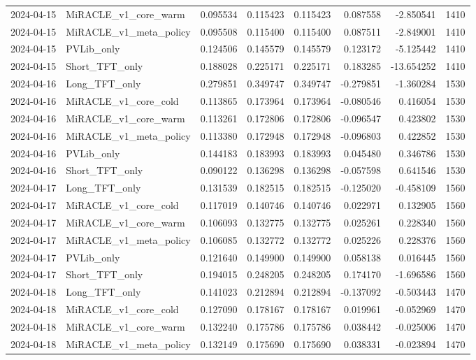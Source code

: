 \begin{tabular}{llrrrrrr}
2024-04-15 & MiRACLE_v1_core_warm & 0.095534 & 0.115423 & 0.115423 & 0.087558 & -2.850541 & 1410 \\
2024-04-15 & MiRACLE_v1_meta_policy & 0.095508 & 0.115400 & 0.115400 & 0.087511 & -2.849001 & 1410 \\
2024-04-15 & PVLib_only & 0.124506 & 0.145579 & 0.145579 & 0.123172 & -5.125442 & 1410 \\
2024-04-15 & Short_TFT_only & 0.188028 & 0.225171 & 0.225171 & 0.183285 & -13.654252 & 1410 \\
2024-04-16 & Long_TFT_only & 0.279851 & 0.349747 & 0.349747 & -0.279851 & -1.360284 & 1530 \\
2024-04-16 & MiRACLE_v1_core_cold & 0.113865 & 0.173964 & 0.173964 & -0.080546 & 0.416054 & 1530 \\
2024-04-16 & MiRACLE_v1_core_warm & 0.113261 & 0.172806 & 0.172806 & -0.096547 & 0.423802 & 1530 \\
2024-04-16 & MiRACLE_v1_meta_policy & 0.113380 & 0.172948 & 0.172948 & -0.096803 & 0.422852 & 1530 \\
2024-04-16 & PVLib_only & 0.144183 & 0.183993 & 0.183993 & 0.045480 & 0.346786 & 1530 \\
2024-04-16 & Short_TFT_only & 0.090122 & 0.136298 & 0.136298 & -0.057598 & 0.641546 & 1530 \\
2024-04-17 & Long_TFT_only & 0.131539 & 0.182515 & 0.182515 & -0.125020 & -0.458109 & 1560 \\
2024-04-17 & MiRACLE_v1_core_cold & 0.117019 & 0.140746 & 0.140746 & 0.022971 & 0.132905 & 1560 \\
2024-04-17 & MiRACLE_v1_core_warm & 0.106093 & 0.132775 & 0.132775 & 0.025261 & 0.228340 & 1560 \\
2024-04-17 & MiRACLE_v1_meta_policy & 0.106085 & 0.132772 & 0.132772 & 0.025226 & 0.228376 & 1560 \\
2024-04-17 & PVLib_only & 0.121640 & 0.149900 & 0.149900 & 0.058138 & 0.016445 & 1560 \\
2024-04-17 & Short_TFT_only & 0.194015 & 0.248205 & 0.248205 & 0.174170 & -1.696586 & 1560 \\
2024-04-18 & Long_TFT_only & 0.141023 & 0.212894 & 0.212894 & -0.137092 & -0.503443 & 1470 \\
2024-04-18 & MiRACLE_v1_core_cold & 0.127090 & 0.178167 & 0.178167 & 0.019961 & -0.052969 & 1470 \\
2024-04-18 & MiRACLE_v1_core_warm & 0.132240 & 0.175786 & 0.175786 & 0.038442 & -0.025006 & 1470 \\
2024-04-18 & MiRACLE_v1_meta_policy & 0.132149 & 0.175690 & 0.175690 & 0.038331 & -0.023894 & 1470 \\

\end{tabular}
